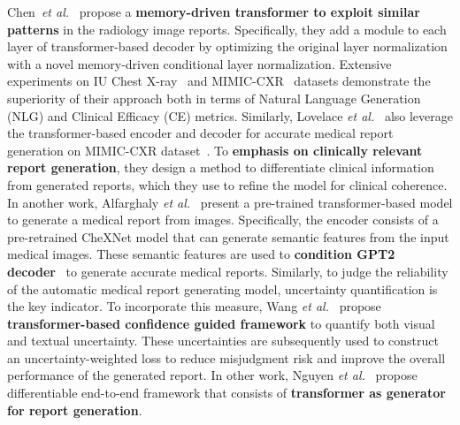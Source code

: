 \documentclass[10pt,journal,compsoc]{IEEEtran}
\begin{document}
Chen~\textit{et al.}~\cite{chen2020generating} propose a \textbf{memory-driven transformer to exploit similar patterns} in the radiology image reports. Specifically, they add a module to each layer of transformer-based decoder by optimizing the original layer normalization with a novel memory-driven conditional layer normalization. Extensive experiments on IU Chest X-ray~\cite{demner2016preparing} and MIMIC-CXR~\cite{johnson2019mimic} datasets demonstrate the superiority of their approach both in terms of Natural Language Generation (NLG) and Clinical Efficacy (CE) metrics. %
Similarly, Lovelace \textit{et al.}~\cite{lovelace2020learning} also leverage the  transformer-based encoder and decoder for accurate medical report generation on  MIMIC-CXR dataset~\cite{johnson2019mimic}. To \textbf{emphasis on clinically relevant report generation}, they design a method to differentiate clinical information from generated reports, which they use to refine the model for clinical coherence. %
In another work, Alfarghaly \textit{et al.}~\cite{alfarghaly2021automated} present a pre-trained transformer-based model to generate a medical report from images. Specifically, the encoder consists of a pre-retrained CheXNet model that can generate semantic features from the input medical images. These semantic features are used to \textbf{condition GPT2 decoder}~\cite{ziegler2019encoder, radford2019language} to generate accurate medical reports. %
Similarly, to judge the reliability of the automatic medical report generating model, uncertainty quantification is the key indicator. To incorporate this measure, Wang \textit{et al.}~\cite{wang2021confidence} propose \textbf{transformer-based confidence guided framework} to quantify both visual and textual uncertainty. These uncertainties are subsequently used to construct an uncertainty-weighted loss to reduce misjudgment risk and improve the overall performance of the generated report. %
In other work, Nguyen \textit{et al.}~\cite{nguyen2021automated} propose differentiable end-to-end framework that consists of \textbf{transformer as generator for report generation}.
\end{document}

